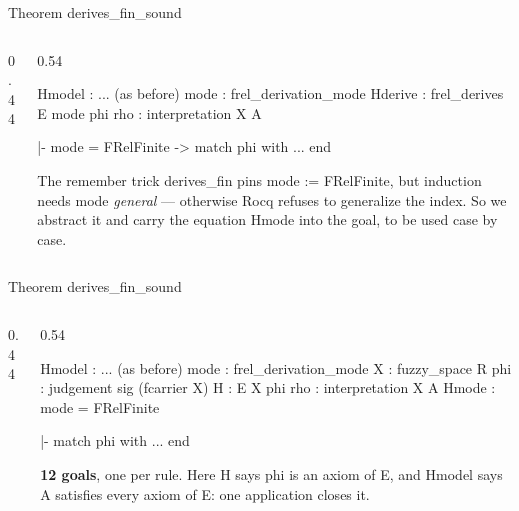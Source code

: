 \documentclass[10pt,aspectratio=169]{beamer}
\newcommand{\rid}[1]{{\ttfamily\small #1}}
\begin{document}
\begin{frame}[fragile]{Theorem \rid{derives\_fin\_sound}}
  \begin{columns}[T]
  \begin{column}{0.44\textwidth}\end{column}
  \begin{column}{0.54\textwidth}
    \begin{goalbox}[title={Proof state}]
\begin{gctx}
Hmodel : ... (as before)
mode : frel_derivation_mode
Hderive : frel_derives E mode phi
rho : interpretation X A
\end{gctx}
\tcblower
\begin{gconc}
|- mode = FRelFinite ->
   match phi with ... end
\end{gconc}
    \end{goalbox}
    \smallskip
    \begin{alertblock}{The \rid{remember} trick}
      \small
      \rid{derives\_fin} pins \rid{mode := FRelFinite}, but
      \rid{induction} needs \rid{mode} \emph{general} --- otherwise
      Rocq refuses to generalize the index. So we abstract it and carry
      the equation \rid{Hmode} into the goal, to be used case by case.
    \end{alertblock}
  \end{column}
  \end{columns}
\end{frame}

\begin{frame}[fragile]{Theorem \rid{derives\_fin\_sound}}
  \begin{columns}[T]
  \begin{column}{0.44\textwidth}\end{column}
  \begin{column}{0.54\textwidth}
    \begin{goalbox}[title={Goal 1 / 12 \quad (FD\_Init)}]
\begin{gctx}
Hmodel : ... (as before)
mode : frel_derivation_mode
X : fuzzy_space R
phi : judgement sig (fcarrier X)
H : E X phi
rho : interpretation X A
Hmode : mode = FRelFinite
\end{gctx}
\tcblower
\begin{gconc}
|- match phi with ... end
\end{gconc}
    \end{goalbox}
    \smallskip
    {\footnotesize \textbf{12 goals}, one per rule. Here \rid{H} says
    \rid{phi} is an axiom of \rid{E}, and \rid{Hmodel} says \rid{A}
    satisfies every axiom of \rid{E}: one application closes it.}
  \end{column}
  \end{columns}
\end{frame}
\end{document}
